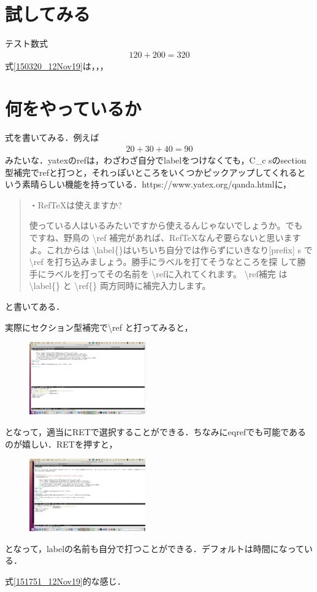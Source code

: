 \documentclass[a4j]{jarticle}
\begin{document}
\section{試してみる}
テスト数式
\begin{align}
 120+200=320\label{150320_12Nov19}
\end{align}
式\ref{150320_12Nov19}は，，，

\section{何をやっているか}
式を書いてみる．例えば
\begin{align}
 20+30+40=90\label{151751_12Nov19}
\end{align}
みたいな．yatexのrefは，わざわざ自分でlabelをつけなくても，C\_c sのsection型補完でrefと打つと，それっぽいところをいくつかピックアップしてくれるという素晴らしい機能を持っている．https://www.yatex.org/qanda.htmlに，


\begin{quotation}
 ・RefTeXは使えますか?
	
	使っている人はいるみたいですから使えるんじゃないでしょうか。でも
	ですね、野鳥の \textbackslash ref 補完があれば、RefTeXなんぞ要らないと思います
	よ。これからは \textbackslash label\{\}はいちいち自分では作らずにいきなり[prefix]
	s で \textbackslash ref を打ち込みましょう。勝手にラベルを打てそうなところを探
	して勝手にラベルを打ってその名前を \textbackslash refに入れてくれます。 \textbackslash ref補完
	は  \textbackslash label\{\} と  \textbackslash ref\{\} 両方同時に補完入力します。
\end{quotation}	
と書いてある．

実際にセクション型補完で\textbackslash ref と打ってみると，
\begin{figure}[htb]
 \centering
\includegraphics[bb=0 0 2560 1600,width=5cm]{スクリーンショット 2019-11-12 15.15.29.png}
\end{figure}
となって，適当にRETで選択することができる．ちなみにeqrefでも可能であるのが嬉しい．RETを押すと，
\begin{figure}[htb]
 \centering
\includegraphics[bb=0 0 2560 1600,width=5cm]{スクリーンショット 2019-11-12 15.18.05.png}
\end{figure}
となって，labelの名前も自分で打つことができる．デフォルトは時間になっている．


式\eqref{151751_12Nov19}的な感じ．
\end{document}
